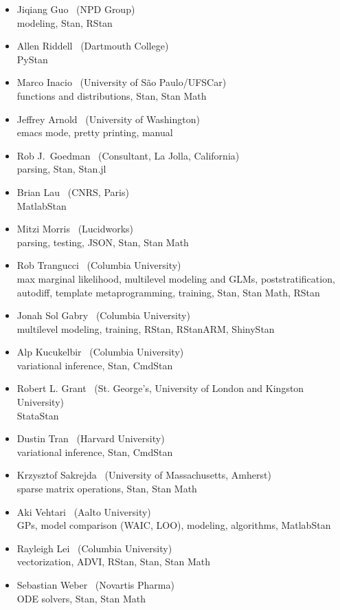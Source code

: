 \begin{itemize}
\\ {\footnotesize chief of optimization, code efficiency, matrix
  algebra, multivariate distributions, \Cpp, Stan, Stan Math, CmdStan}
\item Jiqiang Guo \   (NPD Group)
\\ {\footnotesize modeling, Stan, RStan}
\item Allen Riddell \   (Dartmouth College)
\\ {\footnotesize PyStan}
\item Marco Inacio \   (University of S\~{a}o Paulo/UFSCar)
\\ {\footnotesize functions and distributions, Stan, Stan Math}
\item Jeffrey Arnold \   (University of Washington)
\\ {\footnotesize emacs mode, pretty printing, manual}
\item Rob J.\ Goedman \ (Consultant, La Jolla, California)
\\ {\footnotesize parsing, Stan, Stan.jl}
\item Brian Lau \ (CNRS, Paris)
\\ {\footnotesize MatlabStan}
\item Mitzi Morris \   (Lucidworks)
\\ {\footnotesize parsing, testing, JSON, Stan, Stan Math}
\item Rob Trangucci \   (Columbia University)
\\ {\footnotesize max marginal likelihood, multilevel modeling and
  GLMs, poststratification, autodiff, template metaprogramming, 
  training, Stan, Stan Math, RStan}
\item Jonah Sol Gabry \ (Columbia University)
\\ {\footnotesize multilevel modeling, training, RStan, RStanARM, ShinyStan}
\item Alp Kucukelbir \ (Columbia University)
\\ {\footnotesize variational inference, Stan, CmdStan}
\item Robert L. Grant \ (St. George's, University of London and
  Kingston University)
\\ {\footnotesize StataStan}
\item Dustin Tran \ (Harvard University)
\\ {\footnotesize variational inference, Stan, CmdStan}
\item Krzysztof Sakrejda \ (University of Massachusetts, Amherst)
\\ {\footnotesize sparse matrix operations, Stan, Stan Math}
\item Aki Vehtari \ (Aalto University)
\\ {\footnotesize GPs, model comparison (WAIC, LOO), modeling,
  algorithms, MatlabStan}
\item Rayleigh Lei \ (Columbia University)
\\ {\footnotesize vectorization, ADVI, RStan, Stan, Stan Math}
\item Sebastian Weber \ (Novartis Pharma)
\\ {\footnotesize ODE solvers, Stan, Stan Math}
\end{itemize}

